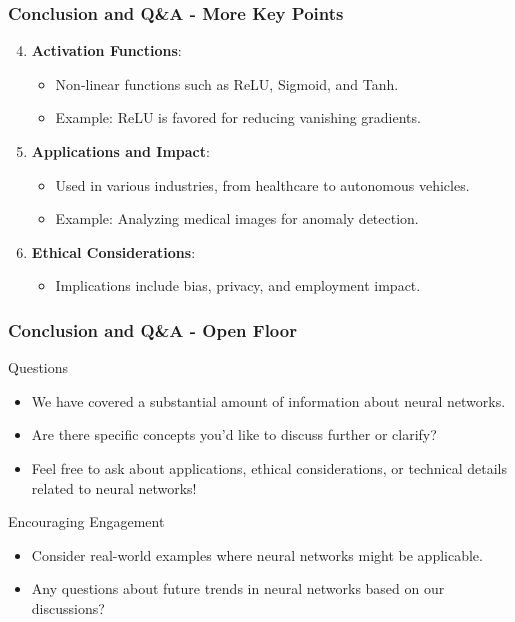 \documentclass[aspectratio=169]{beamer}
\begin{document}
\begin{frame}[fragile]
    \frametitle{Conclusion and Q\&A - More Key Points}
    \begin{enumerate}
        \setcounter{enumi}{3}
        \item \textbf{Activation Functions}:
            \begin{itemize}
                \item Non-linear functions such as ReLU, Sigmoid, and Tanh.
                \item Example: ReLU is favored for reducing vanishing gradients.
            \end{itemize}
        \item \textbf{Applications and Impact}:
            \begin{itemize}
                \item Used in various industries, from healthcare to autonomous vehicles.
                \item Example: Analyzing medical images for anomaly detection.
            \end{itemize}
        \item \textbf{Ethical Considerations}:
            \begin{itemize}
                \item Implications include bias, privacy, and employment impact.
            \end{itemize}
    \end{enumerate}
\end{frame}

\begin{frame}[fragile]
    \frametitle{Conclusion and Q\&A - Open Floor}
    \begin{block}{Questions}
        \begin{itemize}
            \item We have covered a substantial amount of information about neural networks. 
            \item Are there specific concepts you'd like to discuss further or clarify?
            \item Feel free to ask about applications, ethical considerations, or technical details related to neural networks!
        \end{itemize}
    \end{block}

    \begin{block}{Encouraging Engagement}
        \begin{itemize}
            \item Consider real-world examples where neural networks might be applicable.
            \item Any questions about future trends in neural networks based on our discussions?
        \end{itemize}
    \end{block}
\end{frame}
\end{document}
